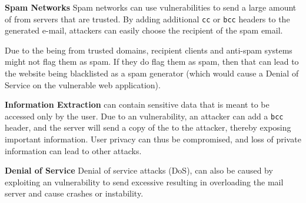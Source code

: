 \noindent\textbf{Spam Networks}
	Spam networks can use \ehi vulnerabilities to send a large amount of \email from servers that are trusted. By adding additional \texttt{cc} or \texttt{bcc} headers to the generated e-mail, attackers can easily choose the recipient of the spam email. 
	
	Due to the \email being from trusted domains, recipient \email clients and anti-spam systems might not flag them as spam. If they do flag them as spam, then that can lead to the website being blacklisted as a spam generator (which would cause a Denial of Service on the vulnerable web application). 
	
\noindent\textbf{Information Extraction}
	\Emails can contain sensitive data that is meant to be accessed only by the user. Due to an \ehi vulnerability, an attacker can add a \texttt{bcc} header, and the \email server will send a copy of the \email to the attacker, thereby exposing important information.
	User privacy can thus be compromised, and loss of private information can lead to other attacks.

    \noindent\textbf{Denial of Service}
    Denial of service attacks (DoS), can also be caused by exploiting an \ehi vulnerability to send excessive \emails resulting in overloading the mail server and cause crashes or instability. 

